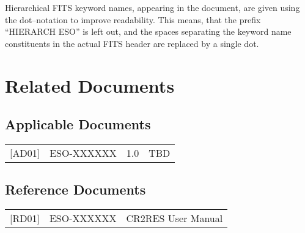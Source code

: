 Hierarchical FITS keyword names, appearing in the document, are given using the
dot--notation to improve readability. This means, that the prefix ``HIERARCH
ESO'' is left out, and the spaces separating the keyword name constituents in
the actual FITS header are replaced by a single dot.

\section{Related Documents}
\label{sec:doc-related}

\subsection{Applicable Documents}
\label{sec:doc-applicable}

\begin{tabularx}{\linewidth}{lllX}
  {[}AD01{]} & ESO-XXXXXX & 1.0
             & TBD \\
\end{tabularx}

\subsection{Reference Documents}
\label{sec:doc-reference}

\begin{tabularx}{\linewidth}{llX}
  {[}RD01{]} & ESO-XXXXXX
             & CR2RES User Manual \\
\end{tabularx}


